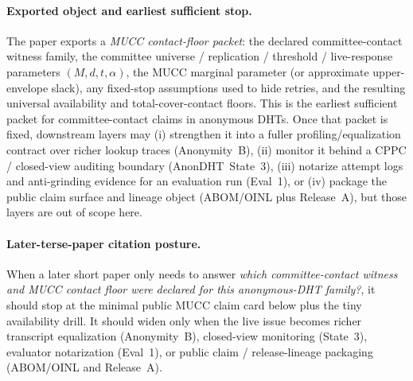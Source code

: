 \documentclass[11pt]{article}
\begin{document}
\paragraph{Exported object and earliest sufficient stop.}
The paper exports a \emph{MUCC contact-floor packet}: the declared committee-contact witness family, the committee universe / replication / threshold / live-response parameters \((M,d,t,\alpha)\), the MUCC marginal parameter (or approximate upper-envelope slack), any fixed-stop assumptions used to hide retries, and the resulting universal availability and total-cover-contact floors.
This is the earliest sufficient packet for committee-contact claims in anonymous DHTs.
Once that packet is fixed, downstream layers may (i) strengthen it into a fuller profiling/equalization contract over richer lookup traces (Anonymity~B), (ii) monitor it behind a CPPC / closed-view auditing boundary (AnonDHT~State~3), (iii) notarize attempt logs and anti-grinding evidence for an evaluation run (Eval~1), or (iv) package the public claim surface and lineage object (ABOM/OINL plus Release~A), but those layers are out of scope here.\cite{series:profiling,series:state3,series:evalnotary,series:abomoinl,series:release}

\paragraph{Later-terse-paper citation posture.}
When a later short paper only needs to answer \emph{which committee-contact witness and MUCC contact floor were declared for this anonymous-DHT family?}, it should stop at the minimal public MUCC claim card below plus the tiny availability drill.
It should widen only when the live issue becomes richer transcript equalization (Anonymity~B), closed-view monitoring (State~3), evaluator notarization (Eval~1), or public claim / release-lineage packaging (ABOM/OINL and Release~A).\cite{series:profiling,series:state3,series:evalnotary,series:abomoinl,series:release}
\end{document}
